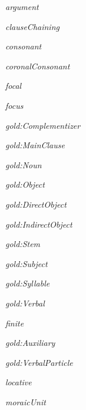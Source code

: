 \begin{ontologytop}
\begin{classlist}
	\item \emph{argument}


	\item \emph{clauseChaining}


	\item \emph{consonant}


	\item \emph{coronalConsonant}


	\item \emph{focal}


	\item \emph{focus}


	\item \emph{gold:Complementizer}


	\item \emph{gold:MainClause}


	\item \emph{gold:Noun}


	\item \emph{gold:Object}


		\begin{classlist}

		\item \emph{gold:DirectObject}


		\item \emph{gold:IndirectObject}


		\end{classlist}

	\item \emph{gold:Stem}


	\item \emph{gold:Subject}


	\item \emph{gold:Syllable}


	\item \emph{gold:Verbal}


		\begin{classlist}

		\item \emph{finite}


		\item \emph{gold:Auxiliary}


		\end{classlist}

	\item \emph{gold:VerbalParticle}


	\item \emph{locative}


	\item \emph{moraicUnit}



\end{classlist}
\end{ontologytop}
